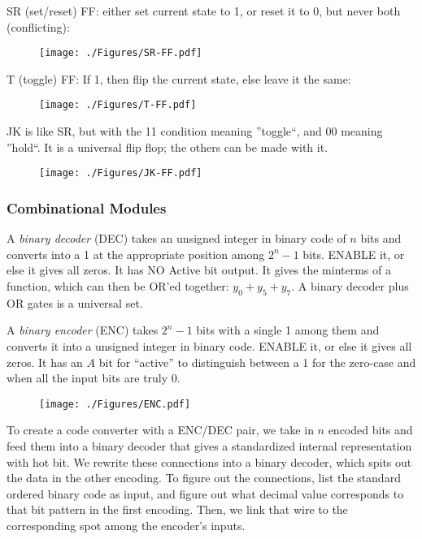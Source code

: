 \documentclass[10pt,letterpaper,twocolumn]{article}
\begin{document}
SR (set/reset) FF: either set current state
to 1, or reset it to 0, but never both (conflicting):

\begin{figure}[H]
    \texttt{[image: ./Figures/SR-FF.pdf]}
    \label{fig:SR-FF}
\end{figure}

T (toggle) FF: If 1, then flip the current state, 
else leave it the same: 

\begin{figure}[H]
    \texttt{[image: ./Figures/T-FF.pdf]}
    \label{fig:T-FF}
\end{figure}

JK is like SR, but with the 11 condition meaning
''toggle``, and 00 meaning ''hold``. 
It is a universal flip flop; the others can be 
made with it.

\begin{figure}[H]
    \texttt{[image: ./Figures/JK-FF.pdf]}
    \label{fig:JK-FF}
\end{figure}


\subsubsection{Combinational Modules}

A \emph{binary decoder} (DEC) takes 
an unsigned integer in binary code of 
$ n $ bits and converts into 
a 1 at the appropriate position among $ 2^n - 1 $
bits. ENABLE it, or else it gives all zeros.
It has NO Active bit output.
It gives the minterms of a function, which 
can then be OR'ed together: $ y_0 + y_5 + y_7 $.
A binary decoder plus OR gates is a universal set.


A \emph{binary encoder} (ENC) takes $ 2^n - 1 $ bits
with a single 1 among them and converts it into 
a unsigned integer in binary code. ENABLE it, 
or else it gives all zeros.
It has an $ A $ bit for ``active'' to 
distinguish between a 1 for the zero-case 
and when all the input bits are truly 0.

\begin{figure}[H]
    \texttt{[image: ./Figures/ENC.pdf]}
\end{figure}

To create a code converter with a ENC/DEC pair, 
we take in $ n $ encoded
bits and feed them into a binary decoder
that gives a standardized internal representation
with hot bit. We rewrite these connections into
a binary decoder, which spits out the data
in the other encoding. To figure out the connections,
list the standard ordered binary code as input, 
and figure out what decimal value corresponds 
to that bit pattern in the first encoding.
Then, we link that wire to the corresponding
spot among the encoder's inputs.
\end{document}
